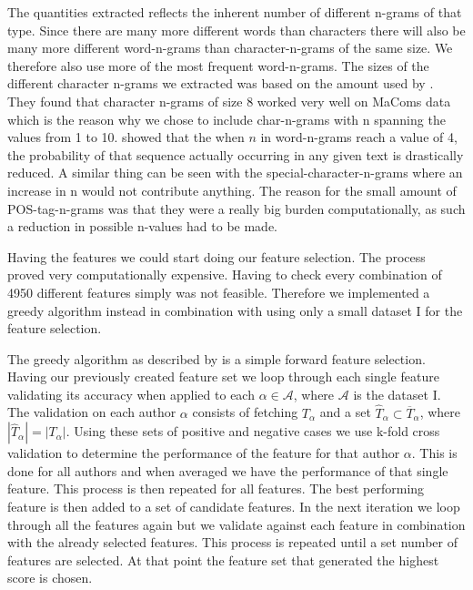 The quantities extracted reflects the inherent number of different n-grams of
that type. Since there are many more different words than characters there will
also be many more different word-n-grams than character-n-grams of the same
size. We therefore also use more of the most frequent word-n-grams. The sizes
of the different character n-grams we extracted was based on the amount used by
\citet{aalykke2016}. They found that character n-grams of size 8 worked very
well on MaComs data which is the reason why we chose to include char-n-grams
with n spanning the values from 1 to 10. \citet{US} showed that the when $n$
in word-n-grams reach a value of 4, the probability of that sequence actually
occurring in any given text is drastically reduced. A similar thing can be seen
with the special-character-n-grams where an increase in n would not contribute
anything. The reason for the small amount of \gls{POS}-tag-n-grams was that
they were a really big burden computationally, as such a reduction in possible
n-values had to be made.

Having the features we could start doing our feature selection. The process
proved very computationally expensive. Having to check every combination of 4950
different features simply was not feasible. Therefore we implemented a greedy
algorithm instead in combination with using only a small dataset \gls{I} for the
feature selection.

The greedy algorithm as described by \citet{kanDeng} is a simple forward feature
selection. Having our previously created feature set we loop through each single
feature validating its accuracy when applied to each $\alpha \in \mathcal{A}$,
where $\mathcal{A}$ is the dataset \gls{I}. The validation on each author
$\alpha$ consists of fetching $T_{\alpha}$ and a set $\hat{T}_{\alpha} \subset
\overline{T}_\alpha$, where $|\hat{T}_\alpha| = |T_\alpha|$. Using these sets
of positive and negative cases we use k-fold cross validation to determine
the performance of the feature for that author $\alpha$. This is done for all
authors and when averaged we have the performance of that single feature. This
process is then repeated for all features. The best performing feature is then
added to a set of candidate features. In the next iteration we loop through all
the features again but we validate against each feature in combination with
the already selected features. This process is repeated until a set number of
features are selected. At that point the feature set that generated the highest
score is chosen.

